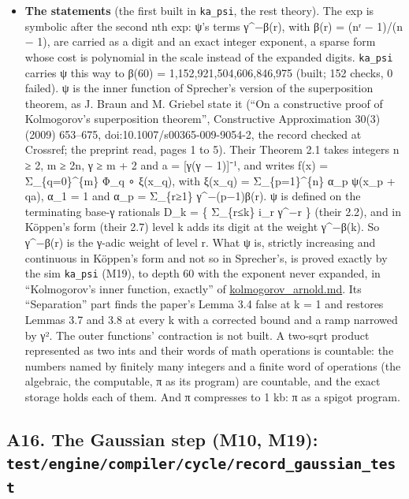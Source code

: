 \begin{itemize}
\item \textbf{The statements} (the first built in \texttt{ka\_\allowbreak{}psi}, the rest theory). The exp is symbolic after the second nth exp: ψ's terms γ\textasciicircum{}−β(r), with β(r) = (nʳ − 1)/(n − 1), are carried as a digit and an exact integer exponent, a sparse form whose cost is polynomial in the scale instead of the expanded digits. \texttt{ka\_\allowbreak{}psi} carries ψ this way to β(60) = 1,152,921,504,606,846,975 (built; 152 checks, 0 failed). ψ is the inner function of Sprecher's version of the superposition theorem, as J. Braun and M. Griebel state it (“On a constructive proof of Kolmogorov's superposition theorem”, Constructive Approximation 30(3) (2009) 653–675, doi:10.1007/s00365-009-9054-2, the record checked at Crossref; the preprint read, pages 1 to 5). Their Theorem 2.1 takes integers n ≥ 2, m ≥ 2n, γ ≥ m + 2 and a = [γ(γ − 1)]⁻¹, and writes f(x) = Σ\_\allowbreak{}\{q=0\}\textasciicircum{}\{m\} Φ\_\allowbreak{}q ∘ ξ(x\_\allowbreak{}q), with ξ(x\_\allowbreak{}q) = Σ\_\allowbreak{}\{p=1\}\textasciicircum{}\{n\} α\_\allowbreak{}p ψ(x\_\allowbreak{}p + qa), α\_\allowbreak{}1 = 1 and α\_\allowbreak{}p = Σ\_\allowbreak{}\{r≥1\} γ\textasciicircum{}−(p−1)β(r). ψ is defined on the terminating base-γ rationals D\_\allowbreak{}k = \{ Σ\_\allowbreak{}\{r≤k\} i\_\allowbreak{}r γ\textasciicircum{}−r \} (their 2.2), and in Köppen's form (their 2.7) level k adds its digit at the weight γ\textasciicircum{}−β(k). So γ\textasciicircum{}−β(r) is the γ-adic weight of level r. What ψ is, strictly increasing and continuous in Köppen's form and not so in Sprecher's, is proved exactly by the sim \texttt{ka\_\allowbreak{}psi} (M19), to depth 60 with the exponent never expanded, in “Kolmogorov's inner function, exactly” of \hyperref[chap:kolmogorov-arnold]{kolmogorov\_\allowbreak{}arnold.md}. Its “Separation” part finds the paper's Lemma 3.4 false at k = 1 and restores Lemmas 3.7 and 3.8 at every k with a corrected bound and a ramp narrowed by γ². The outer functions' contraction is not built. A two-sqrt product represented as two ints and their words of math operations is countable: the numbers named by finitely many integers and a finite word of operations (the algebraic, the computable, π as its program) are countable, and the exact storage holds each of them. And π compresses to 1 kb: π as a spigot program.
\end{itemize}

\subsection{\texorpdfstring{A16. The Gaussian step (M10, M19): \texttt{test/\allowbreak{}engine/\allowbreak{}compiler/\allowbreak{}cycle/\allowbreak{}record\_\allowbreak{}gaussian\_\allowbreak{}test}}{A16. The Gaussian step (M10, M19): test/engine/compiler/cycle/record\_gaussian\_test}}

